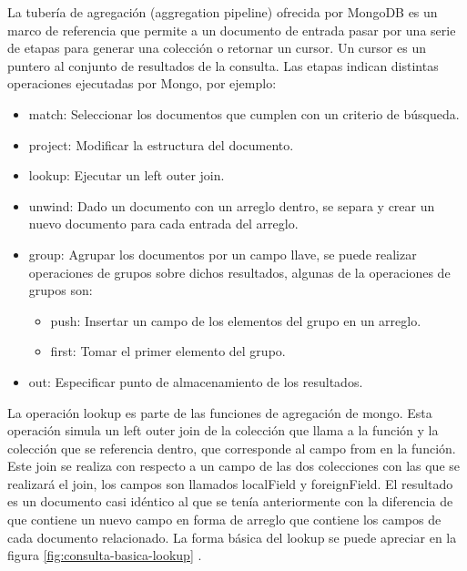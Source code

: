 \documentclass[conference,compsoc]{sty/IEEEtran}
\begin{document}
La tubería de agregación (aggregation pipeline) ofrecida por MongoDB es un marco de referencia que permite a un documento de entrada pasar por una serie de etapas para generar una colección o retornar un cursor. Un cursor es un puntero al conjunto de resultados de la consulta\cite{aggregationMongo}. Las etapas indican distintas operaciones ejecutadas por Mongo, por ejemplo: 
 \begin{itemize}
     \item match: Seleccionar los documentos que cumplen con un criterio de búsqueda.%
     \item project: Modificar la estructura del documento. %
     \item lookup: Ejecutar un left outer join.   
     \item unwind: Dado un documento con un arreglo dentro, se separa y crear un nuevo documento para cada entrada del arreglo. 
     \item group: Agrupar los documentos por un campo llave, se puede realizar operaciones de grupos sobre dichos resultados, algunas de la operaciones de grupos son:
     \begin{itemize}
         \item push: Insertar un campo de los elementos del grupo en un arreglo.
         \item first: Tomar el primer elemento del grupo.
     \end{itemize}
     \item out: Especificar punto de almacenamiento de los resultados.
 \end{itemize}
La operación lookup es parte de las funciones de agregación de mongo. Esta operación simula un left outer join de la colección que llama a la función y la colección que se referencia dentro, que corresponde al campo from en la función. Este join se realiza con respecto a un campo de las dos colecciones con las que se realizará el join, los campos son llamados localField y foreignField.  El resultado es un documento casi idéntico al que se tenía anteriormente con la diferencia de que contiene un nuevo campo en forma de arreglo que contiene los campos de cada documento relacionado. La forma básica del lookup se puede apreciar en la figura \ref{fig:consulta-basica-lookup} \cite{lookupMongo}.
\end{document}
